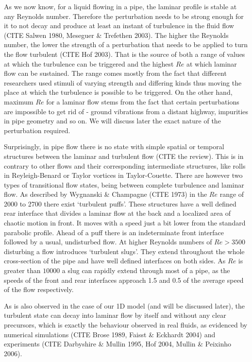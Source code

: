 \documentclass[11pt,a4paper]{article}
\begin{document}
As we now know, for a liquid flowing in a pipe, the laminar profile is stable at any Reynolds number.
Therefore the perturbation needs to be strong enough for it to not decay and produce at least an instant of turbulence in the fluid flow (CITE Salwen 1980, Meseguer \& Trefethen 2003).
The higher the Reynolds number, the lower the strength of a perturbation that needs to be applied to turn the flow turbulent (CITE Hof 2003).
That is the source of both a range of values at which the turbulence can be triggered and the highest \(Re\) at which laminar flow can be sustained.
The range comes mostly from the fact that different researchers used stimuli of varying strength and differing kinds thus moving the place at which the turbulence is possible to be triggered.
On the other hand, maximum \(Re\) for a laminar flow stems from the fact that certain perturbations are impossible to get rid of - ground vibrations from a distant highway, impurities in pipe geometry and so on.
We will discuss later the exact nature of the perturbation required.

Surprisingly, in pipe flow there is no state with simple spatial or temporal structures between the laminar and turbulent flow (CITE the review).
This is in contrary to other flows and their corresponding intermediate structures, like rolls in Reyleigh-Benard or Taylor vortices in Taylor-Couette.
There are however two types of transitional flow states, being between complete turbulence and laminar flow.
As described by Wygnanski \& Champagne (CITE 1973) in the \(Re\) range of 2000 to 2700 there exist `turbulent puffs'.
These structures have a well defined rear interface that divides a laminar flow at the back and a localized area of chaotic motion in front.
It moves with a speed just a bit lower from the standard parabolic profile.
Ahead of a puff there is an indeterminate front interface followed by a usual, undisturbed flow.
At higher Reynolds numbers of \(Re > 3500\) disturbing a flow introduces `turbulent slugs'.
They extend throughout the whole cross-section of the pipe and have well defined interfaces on both sides.
As \(Re\) is greater than \(10000\) a slug can rapidly extend through most of a pipe, as the speeds of the front and rear interfaces approach 1.5 and 0.5 of the average speed of the flow respectively.

As is also observed in the case of our 1D model (and will be discussed later), the turbulent state can decay into laminar flow by itself and without any clear precursors, which is exactly the behaviour observed in real fluids, as evidenced by numerical simulations (CITE Brose 1989, Faisst \& Eckhardt 2004) and experiments (CITE Darbyshire \& Mullin 1995, Hof 2004, Mullin \& Peixinho 2006).
\end{document}
